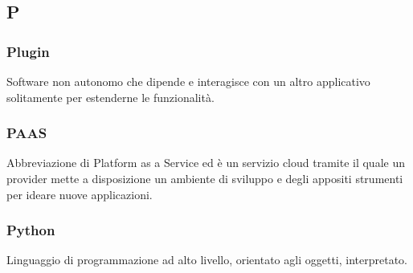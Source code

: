 \subsection*{\textbf{\hfill \Huge{P} \hfill}} 

\subsubsection*{Plugin}
Software non autonomo che dipende e interagisce con un altro applicativo solitamente per estenderne le funzionalità.

\subsubsection*{PAAS}
Abbreviazione di Platform as a Service ed è un servizio cloud tramite il quale un provider mette a disposizione un ambiente di sviluppo e degli appositi strumenti per ideare nuove applicazioni.

\subsubsection*{Python}
Linguaggio di programmazione ad alto livello, orientato agli oggetti, interpretato.
